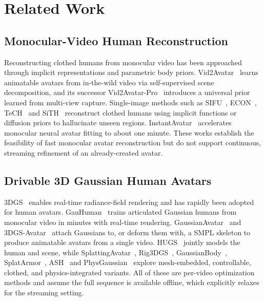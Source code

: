 \section{Related Work}\label{sec:related}

\subsection{Monocular-Video Human Reconstruction}
Reconstructing clothed humans from monocular video has been approached
through implicit representations and parametric body priors.
Vid2Avatar~\cite{guo2023vid2avatar} learns animatable avatars from
in-the-wild video via self-supervised scene decomposition, and its
successor Vid2Avatar-Pro~\cite{guo2025vid2avatarpro} introduces a universal
prior learned from multi-view capture. Single-image methods such as
SIFU~\cite{zhang2024sifu}, ECON~\cite{xiu2023econ}, TeCH~\cite{huang2023tech}
and SiTH~\cite{ho2024sith} reconstruct clothed humans using implicit
functions or diffusion priors to hallucinate unseen regions.
InstantAvatar~\cite{jiang2023instantavatar} accelerates monocular neural
avatar fitting to about one minute. These works establish the feasibility
of fast monocular avatar reconstruction but do not support continuous,
streaming refinement of an already-created avatar.

\subsection{Drivable 3D Gaussian Human Avatars}
3DGS~\cite{kerbl3Dgaussians} enables real-time radiance-field rendering and
has rapidly been adopted for human avatars.
GauHuman~\cite{hu2024gauhuman} trains articulated Gaussian humans from
monocular video in minutes with real-time rendering.
GaussianAvatar~\cite{hu2024gaussianavatar} and
3DGS-Avatar~\cite{qian2024gsavatar} attach Gaussians to, or deform them
with, a SMPL skeleton to produce animatable avatars from a single video.
HUGS~\cite{kocabas2024hugs} jointly models the human and scene, while
SplattingAvatar~\cite{shao2024splattingavatar},
Rig3DGS~\cite{rivero2024rig3dgs}, GaussianBody~\cite{li2024gaussianbody},
SplatArmor~\cite{jena2023splatarmor}, ASH~\cite{pang2024ash} and
PhysGaussian~\cite{xie2024physgaussian} explore mesh-embedded, controllable,
clothed, and physics-integrated variants. All of these are per-video
optimization methods and assume the full sequence is available offline,
which \method{} explicitly relaxes for the streaming setting.


